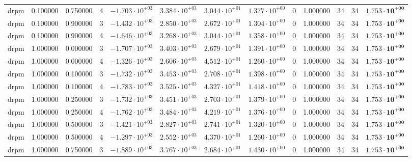 \begin{table}
\begin{tabular}{ccccccccccccc}
drpm & 0.100000 & 0.750000 & 4 & $-1.703 \cdot 10^{+03}$ & $3.384 \cdot 10^{+03}$ & $3.044 \cdot 10^{+01}$ & $1.377 \cdot 10^{+00}$ & 0 & 1.000000 & 34 & 34 & $\mathbf{1.753 \cdot 10^{+00}}$ \\
drpm & 0.100000 & 0.900000 & 3 & $-1.432 \cdot 10^{+03}$ & $2.850 \cdot 10^{+03}$ & $2.672 \cdot 10^{+01}$ & $1.304 \cdot 10^{+00}$ & 0 & 1.000000 & 34 & 34 & $\mathbf{1.753 \cdot 10^{+00}}$ \\
drpm & 0.100000 & 0.900000 & 4 & $-1.646 \cdot 10^{+03}$ & $3.268 \cdot 10^{+03}$ & $3.044 \cdot 10^{+01}$ & $1.358 \cdot 10^{+00}$ & 0 & 1.000000 & 34 & 34 & $\mathbf{1.753 \cdot 10^{+00}}$ \\
drpm & 1.000000 & 0.000000 & 3 & $-1.707 \cdot 10^{+03}$ & $3.403 \cdot 10^{+03}$ & $2.679 \cdot 10^{+01}$ & $1.391 \cdot 10^{+00}$ & 0 & 1.000000 & 34 & 34 & $\mathbf{1.753 \cdot 10^{+00}}$ \\
drpm & 1.000000 & 0.000000 & 4 & $-1.326 \cdot 10^{+03}$ & $2.606 \cdot 10^{+03}$ & $4.512 \cdot 10^{+01}$ & $1.260 \cdot 10^{+00}$ & 0 & 1.000000 & 34 & 34 & $\mathbf{1.753 \cdot 10^{+00}}$ \\
drpm & 1.000000 & 0.100000 & 3 & $-1.732 \cdot 10^{+03}$ & $3.453 \cdot 10^{+03}$ & $2.708 \cdot 10^{+01}$ & $1.398 \cdot 10^{+00}$ & 0 & 1.000000 & 34 & 34 & $\mathbf{1.753 \cdot 10^{+00}}$ \\
drpm & 1.000000 & 0.100000 & 4 & $-1.783 \cdot 10^{+03}$ & $3.525 \cdot 10^{+03}$ & $4.327 \cdot 10^{+01}$ & $1.418 \cdot 10^{+00}$ & 0 & 1.000000 & 34 & 34 & $\mathbf{1.753 \cdot 10^{+00}}$ \\
drpm & 1.000000 & 0.250000 & 3 & $-1.732 \cdot 10^{+03}$ & $3.451 \cdot 10^{+03}$ & $2.703 \cdot 10^{+01}$ & $1.379 \cdot 10^{+00}$ & 0 & 1.000000 & 34 & 34 & $\mathbf{1.753 \cdot 10^{+00}}$ \\
drpm & 1.000000 & 0.250000 & 4 & $-1.762 \cdot 10^{+03}$ & $3.484 \cdot 10^{+03}$ & $4.219 \cdot 10^{+01}$ & $1.376 \cdot 10^{+00}$ & 0 & 1.000000 & 34 & 34 & $\mathbf{1.753 \cdot 10^{+00}}$ \\
drpm & 1.000000 & 0.500000 & 3 & $-1.421 \cdot 10^{+03}$ & $2.827 \cdot 10^{+03}$ & $2.741 \cdot 10^{+01}$ & $1.320 \cdot 10^{+00}$ & 0 & 1.000000 & 34 & 34 & $\mathbf{1.753 \cdot 10^{+00}}$ \\
drpm & 1.000000 & 0.500000 & 4 & $-1.297 \cdot 10^{+03}$ & $2.552 \cdot 10^{+03}$ & $4.370 \cdot 10^{+01}$ & $1.260 \cdot 10^{+00}$ & 0 & 1.000000 & 34 & 34 & $\mathbf{1.753 \cdot 10^{+00}}$ \\
drpm & 1.000000 & 0.750000 & 3 & $-1.889 \cdot 10^{+03}$ & $3.767 \cdot 10^{+03}$ & $2.684 \cdot 10^{+01}$ & $1.430 \cdot 10^{+00}$ & 0 & 1.000000 & 34 & 34 & $\mathbf{1.753 \cdot 10^{+00}}$ \\

\end{tabular}
\end{table}
